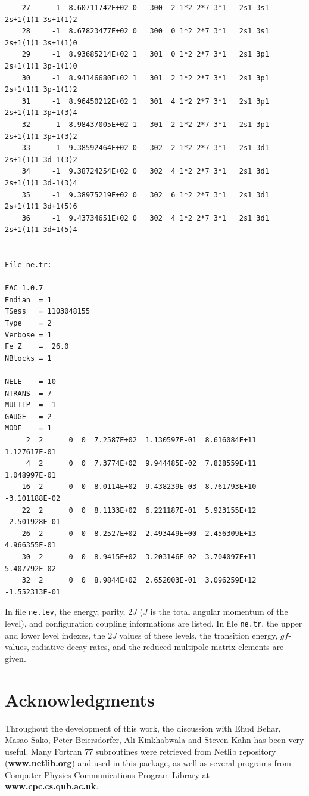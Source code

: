 \documentclass[twoside,letterpaper]{refrep}
\begin{document}
\begin{verbatim}
    27     -1  8.60711742E+02 0   300  2 1*2 2*7 3*1   2s1 3s1     2s+1(1)1 3s+1(1)2 
    28     -1  8.67823477E+02 0   300  0 1*2 2*7 3*1   2s1 3s1     2s+1(1)1 3s+1(1)0 
    29     -1  8.93685214E+02 1   301  0 1*2 2*7 3*1   2s1 3p1     2s+1(1)1 3p-1(1)0 
    30     -1  8.94146680E+02 1   301  2 1*2 2*7 3*1   2s1 3p1     2s+1(1)1 3p-1(1)2 
    31     -1  8.96450212E+02 1   301  4 1*2 2*7 3*1   2s1 3p1     2s+1(1)1 3p+1(3)4 
    32     -1  8.98437005E+02 1   301  2 1*2 2*7 3*1   2s1 3p1     2s+1(1)1 3p+1(3)2 
    33     -1  9.38592464E+02 0   302  2 1*2 2*7 3*1   2s1 3d1     2s+1(1)1 3d-1(3)2 
    34     -1  9.38724254E+02 0   302  4 1*2 2*7 3*1   2s1 3d1     2s+1(1)1 3d-1(3)4 
    35     -1  9.38975219E+02 0   302  6 1*2 2*7 3*1   2s1 3d1     2s+1(1)1 3d+1(5)6 
    36     -1  9.43734651E+02 0   302  4 1*2 2*7 3*1   2s1 3d1     2s+1(1)1 3d+1(5)4 


File ne.tr:

FAC 1.0.7
Endian  = 1
TSess   = 1103048155
Type    = 2
Verbose = 1
Fe Z    =  26.0
NBlocks = 1

NELE    = 10
NTRANS  = 7
MULTIP  = -1
GAUGE   = 2
MODE    = 1
     2  2      0  0  7.2587E+02  1.130597E-01  8.616084E+11  1.127617E-01
     4  2      0  0  7.3774E+02  9.944485E-02  7.828559E+11  1.048997E-01
    16  2      0  0  8.0114E+02  9.438239E-03  8.761793E+10 -3.101188E-02
    22  2      0  0  8.1133E+02  6.221187E-01  5.923155E+12 -2.501928E-01
    26  2      0  0  8.2527E+02  2.493449E+00  2.456309E+13  4.966355E-01
    30  2      0  0  8.9415E+02  3.203146E-02  3.704097E+11  5.407792E-02
    32  2      0  0  8.9844E+02  2.652003E-01  3.096259E+12 -1.552313E-01
\end{verbatim}

In file \verb|ne.lev|, the energy, parity, $2J$ ($J$ is the total
angular momentum of the level), and configuration coupling informations are
listed. In file \verb|ne.tr|, the upper and lower level indexes, the $2J$
values of these levels, the transition energy, $gf$-values, radiative
decay rates, and the reduced multipole matrix elements are given.

\section*{Acknowledgments}
Throughout the development of this work, the discussion with Ehud Behar, Masao
Sako, Peter Beiersdorfer, Ali Kinkhabwala and Steven Kahn has been very
useful. Many Fortran 77 subroutines were retrieved from Netlib repository
(\textbf{www.netlib.org}) and used in this package, as well as several
programs from Computer Physics Communications Program Library at
\textbf{www.cpc.cs.qub.ac.uk}.
\end{document}

